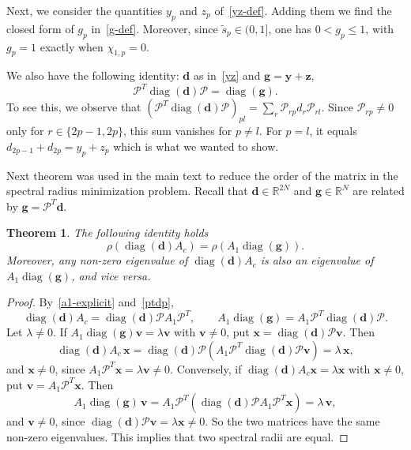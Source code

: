 \documentclass[11pt]{article}
\theoremstyle{plain}
\newtheorem{theorem}{Theorem}[section]
\theoremstyle{definition}
\theoremstyle{remark}
\numberwithin{equation}{section}
\numberwithin{figure}{section}
\numberwithin{table}{section}
\numberwithin{algorithm}{section}
\begin{document}
Next, we consider the quantities $y_p$ and $z_p$ of~\eqref{yz-def}. Adding
them we find the closed form of $g_p$ in~\eqref{g-def}. Moreover, since $\widetilde s_p\in(0,1]$, one has $0<g_p\le 1$, with $g_p=1$ exactly when $\chi_{1,p}=0$.

We also have the following identity: $\bm d$ as in~\eqref{yz} and $\bm g=\bm y+\bm z$,
\begin{equation}\label{ptdp}
\mathscr{P}^T\operatorname{diag}(\bm d)\mathscr{P}=\operatorname{diag}(\bm g).
\end{equation}
To see this, 
we observe that 
$\left(\mathscr{P}^T\operatorname{diag}(\bm d)\mathscr{P}\right)_{pl}
=\sum_{r}\mathscr{P}_{rp}d_r\mathscr{P}_{rl}$. Since $\mathscr{P}_{rp}\neq 0$ only
for $r\in\{2p-1,2p\}$, this sum vanishes for $p\neq l$. For $p=l$, it equals $d_{2p-1}+d_{2p}=y_p+z_p$ which is what we wanted to show.

Next theorem was used in the main text to reduce the order of the matrix in the spectral radius minimization problem.
Recall that $\bm d\in\mathbb{R}^{2N}$ and $\bm g\in\mathbb{R}^{N}$ are related by $\bm g=\mathscr{P}^T\bm d$.
\begin{theorem}\label{reduction}
The following identity holds
\begin{equation}
\rho\left(\operatorname{diag}(\bm d)A_c\right)=\rho\left(A_1\operatorname{diag}(\bm g)\right).
\end{equation}
Moreover, any non-zero eigenvalue of $\operatorname{diag}(\bm d)A_c$ is also an
eigenvalue of $A_1\operatorname{diag}(\bm g)$, and vice versa.
\end{theorem}
\begin{proof}
By~\eqref{a1-explicit} and~\eqref{ptdp},
\begin{equation}\label{two-products}
\operatorname{diag}(\bm d)A_c=\operatorname{diag}(\bm d)\mathscr{P}A_1\mathscr{P}^T,
\qquad
A_1\operatorname{diag}(\bm g)=A_1\mathscr{P}^T\operatorname{diag}(\bm d)\mathscr{P}.
\end{equation}
Let $\lambda\neq 0$. If $A_1\operatorname{diag}(\bm g)\bm v=\lambda\bm v$ with
$\bm v\neq 0$, put $\bm x=\operatorname{diag}(\bm d)\mathscr{P}\bm v$. Then
\begin{equation}
\operatorname{diag}(\bm d)A_c\,\bm x
=\operatorname{diag}(\bm d)\mathscr{P}\left(A_1\mathscr{P}^T\operatorname{diag}(\bm d)\mathscr{P}\bm v\right)
=\lambda\,\bm x,
\end{equation}
and $\bm x\neq 0$, since $A_1\mathscr{P}^T\bm x=\lambda\bm v\neq 0$.
Conversely, if $\operatorname{diag}(\bm d)A_c\bm x=\lambda\bm x$ with
$\bm x\neq 0$, put $\bm v=A_1\mathscr{P}^T\bm x$. Then
\begin{equation}
A_1\operatorname{diag}(\bm g)\,\bm v
=A_1\mathscr{P}^T\left(\operatorname{diag}(\bm d)\mathscr{P}A_1\mathscr{P}^T\bm x\right)
=\lambda\,\bm v,
\end{equation}
and $\bm v\neq 0$, since $\operatorname{diag}(\bm d)\mathscr{P}\bm v=\lambda\bm x\neq 0$.
So the two matrices have the same non-zero eigenvalues. This implies that two spectral radii are equal.
\end{proof}
\end{document}

